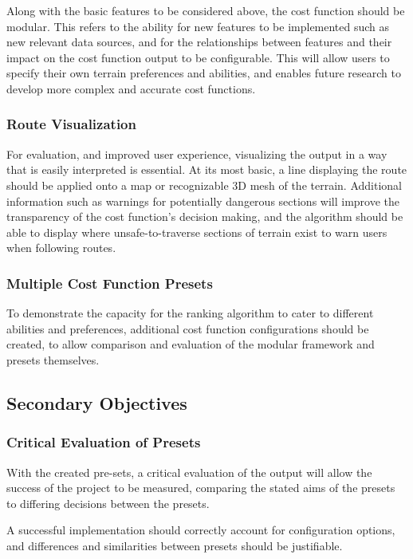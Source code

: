\documentclass[12pt]{article}
\begin{document}
Along with the basic features to be considered above, the cost function should be modular. This refers to the ability for new features to be implemented such as new relevant data sources, and for the relationships between features and their impact on the cost function output to be configurable. This will allow users to specify their own terrain preferences and abilities, and enables future research to develop more complex and accurate cost functions.

\subsubsection{Route Visualization}

For evaluation, and improved user experience, visualizing the output in a way that is easily interpreted is essential. At its most basic, a line displaying the route should be applied onto a map or recognizable 3D mesh of the terrain. Additional information such as warnings for potentially dangerous sections will improve the transparency of the cost function's decision making, and the algorithm should be able to display where unsafe-to-traverse sections of terrain exist to warn users when following routes.

\subsubsection{Multiple Cost Function Presets}

To demonstrate the capacity for the ranking algorithm to cater to different abilities and preferences, additional cost function configurations should be created, to allow comparison and evaluation of the modular framework and presets themselves.

\subsection{Secondary Objectives}

\subsubsection{Critical Evaluation of Presets}

With the created pre-sets, a critical evaluation of the output will allow the success of the project to be measured, comparing the stated aims of the presets to differing decisions between the presets.

A successful implementation should correctly account for configuration options, and differences and similarities between presets should be justifiable.
\end{document}
